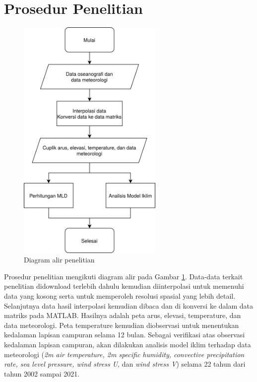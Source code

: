 \section[Prosedur Penelitian]{Prosedur Penelitian}
\begin{spacing}{1.5}
	\begin{figure}[H]
		\centering
		\includegraphics[width=7cm]{contents/flowchart.png}
		\caption{Diagram alir penelitian}
		\label{fig:flowchart}
	\end{figure}
	Prosedur penelitian mengikuti diagram alir pada Gambar \ref{fig:flowchart}. Data-data terkait penelitian didownload terlebih dahulu kemudian diinterpolasi untuk memenuhi data yang kosong serta untuk memperoleh resolusi spasial yang lebih detail. Selanjutnya data hasil interpolasi kemudian dibaca dan di konversi ke dalam data matriks pada MATLAB. Hasilnya adalah peta arus, elevasi, temperature, dan data meteorologi. Peta temperature kemudian diobservasi untuk menentukan kedalaman lapisan campuran selama 12 bulan. Sebagai verifikasi atas observasi kedalaman lapisan campuran, akan dilakukan analisis model iklim terhadap data meteorologi (\textit{2m air temperature, 2m specific humidity, convective precipitation rate, sea level pressure, wind stress U}, dan \textit{wind stress V}) selama 22 tahun dari tahun 2002 sampai 2021.
\end{spacing}
\vspace{-0.5pc}
